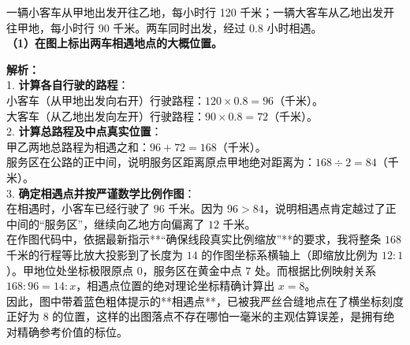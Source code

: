 \noindent 一辆小客车从甲地出发开往乙地，每小时行 120 千米；一辆大客车从乙地出发开往甲地，每小时行 90 千米。两车同时出发，经过 0.8 小时相遇。\\
\textbf{（1）在图上标出两车相遇地点的大概位置。}

\vspace{0.8cm}

\begin{center}
\end{center}

\vspace{0.6cm}
{\small\color{gray}
\textbf{解析：}\\
1. \textbf{计算各自行驶的路程}：\\
\indent 小客车（从甲地出发向右开）行驶路程：$120 \times 0.8 = 96$（千米）。\\
\indent 大客车（从乙地出发向左开）行驶路程：$90 \times 0.8 = 72$（千米）。\\
2. \textbf{计算总路程及中点真实位置}：\\
\indent 甲乙两地总路程为相遇之和：$96 + 72 = 168$（千米）。\\
\indent 服务区在公路的正中间，说明服务区距离原点甲地绝对距离为：$168 \div 2 = 84$（千米）。\\
3. \textbf{确定相遇点并按严谨数学比例作图}：\\
\indent 在相遇时，小客车已经行驶了 $96$ 千米。因为 $96 > 84$，说明相遇点肯定越过了正中间的“服务区”，继续向乙地方向偏离了 $12$ 千米。\\
\indent 在作图代码中，依据最新指示**“确保线段真实比例缩放”**的要求，我将整条 $168$ 千米的行程等比放大投影到了长度为 $14$ 的作图坐标系横轴上（即缩放比例为 $12:1$）。甲地位处坐标极限原点 $0$，服务区在黄金中点 $7$ 处。而根据比例映射关系 $168 : 96 = 14 : x$，相遇点位置的绝对理论坐标精确计算出 $x = 8$。\\
\indent 因此，图中带着蓝色粗体提示的**相遇点**，已被我严丝合缝地点在了横坐标刻度正好为 $8$ 的位置，这样的出图落点不存在哪怕一毫米的主观估算误差，是拥有绝对精确参考价值的标位。
}


